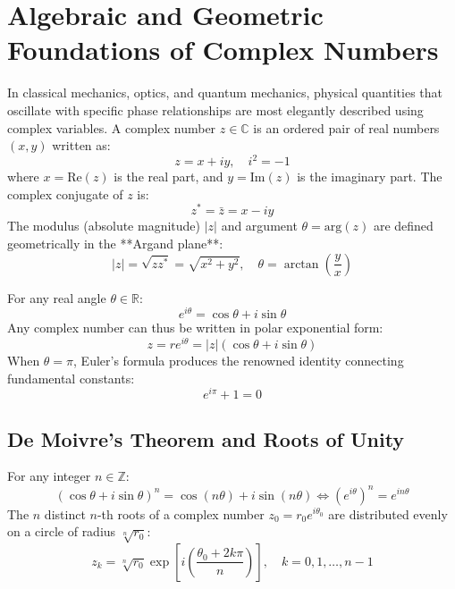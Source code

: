 \section{Algebraic and Geometric Foundations of Complex Numbers}
In classical mechanics, optics, and quantum mechanics, physical quantities that oscillate with specific phase relationships are most elegantly described using complex variables. A complex number $z \in \mathbb{C}$ is an ordered pair of real numbers $(x, y)$ written as:
\begin{equation}
z = x + iy, \quad i^2 = -1
\end{equation}
where $x = \text{Re}(z)$ is the real part, and $y = \text{Im}(z)$ is the imaginary part. The complex conjugate of $z$ is:
\begin{equation}
z^* = \bar{z} = x - iy
\end{equation}
The modulus (absolute magnitude) $|z|$ and argument $\theta = \text{arg}(z)$ are defined geometrically in the **Argand plane**:
\begin{equation}
|z| = \sqrt{z z^*} = \sqrt{x^2 + y^2}, \quad \theta = \arctan\left(\frac{y}{x}\right)
\end{equation}

\begin{maththeorem}
For any real angle $\theta \in \mathbb{R}$:
\begin{equation}
e^{i\theta} = \cos\theta + i\sin\theta
\end{equation}
Any complex number can thus be written in polar exponential form:
\begin{equation}
z = r e^{i\theta} = |z|(\cos\theta + i\sin\theta)
\end{equation}
When $\theta = \pi$, Euler's formula produces the renowned identity connecting fundamental constants:
\begin{equation}
e^{i\pi} + 1 = 0
\end{equation}
\end{maththeorem}

\subsection{De Moivre's Theorem and Roots of Unity}
For any integer $n \in \mathbb{Z}$:
\begin{equation}
(\cos\theta + i\sin\theta)^n = \cos(n\theta) + i\sin(n\theta) \iff (e^{i\theta})^n = e^{in\theta}
\end{equation}
The $n$ distinct $n$-th roots of a complex number $z_0 = r_0 e^{i\theta_0}$ are distributed evenly on a circle of radius $\sqrt[n]{r_0}$:
\begin{equation}
z_k = \sqrt[n]{r_0} \exp\left[i\left(\frac{\theta_0 + 2k\pi}{n}\right)\right], \quad k = 0, 1, \dots, n-1
\end{equation}


